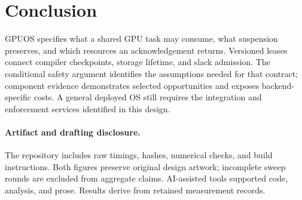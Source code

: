 \section{Conclusion}
GPUOS specifies what a shared GPU task may consume, what suspension
preserves, and which resources an acknowledgement returns. Versioned leases
connect compiler checkpoints, storage lifetime, and slack admission. The
conditional safety argument identifies the assumptions needed for that
contract; component evidence demonstrates selected opportunities and exposes
backend-specific costs. A general deployed OS still requires the integration
and enforcement services identified in this design.

\paragraph{Artifact and drafting disclosure.}
The repository includes raw timings, hashes, numerical checks, and build
instructions. Both figures preserve original design artwork; incomplete sweep rounds
are excluded from aggregate claims. AI-assisted tools supported code,
analysis, and prose. Results derive from retained measurement records.

